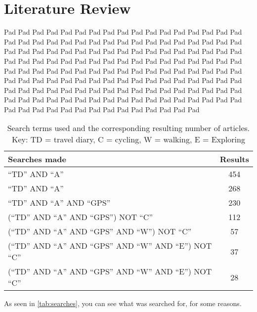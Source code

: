 \chapter{Literature Review}
\label{lr}

Pad Pad Pad Pad Pad Pad Pad Pad Pad Pad Pad Pad Pad Pad Pad Pad Pad Pad Pad Pad Pad Pad Pad Pad Pad Pad Pad Pad Pad Pad Pad Pad Pad Pad Pad Pad Pad Pad Pad Pad Pad Pad Pad Pad Pad Pad Pad Pad Pad Pad Pad Pad Pad Pad Pad Pad Pad Pad Pad Pad Pad Pad Pad Pad Pad Pad Pad Pad Pad Pad Pad Pad Pad Pad Pad Pad Pad Pad Pad Pad Pad Pad Pad Pad Pad Pad Pad Pad Pad Pad Pad Pad Pad Pad Pad Pad Pad Pad Pad Pad Pad Pad Pad Pad Pad Pad Pad Pad Pad Pad Pad Pad Pad Pad Pad Pad Pad Pad Pad Pad Pad Pad Pad Pad Pad Pad Pad Pad Pad Pad Pad Pad Pad Pad Pad Pad Pad Pad Pad Pad Pad Pad Pad Pad Pad Pad Pad Pad Pad Pad 

\begin{table}
\caption{Search terms used and the corresponding resulting number of articles. Key: TD = travel diary, C = cycling, W = walking, E = Exploring}
    \centering
    \footnotesize
        \begin{tabular}{lc}
            \toprule
            Searches made & Results \\
            \midrule
            ``TD'' AND ``A'' & 454 \\

            ``TD'' AND ``A'' & 268 \\

            ``TD'' AND ``A'' AND ``GPS'' & 230 \\

            (``TD'' AND ``A'' AND ``GPS'') NOT ``C'' & 112 \\

            (``TD'' AND ``A'' AND ``GPS'' AND ``W'') NOT ``C'' & 57 \\

            (``TD'' AND ``A'' AND ``GPS'' AND ``W'' AND ``E'') NOT ``C'' & 37 \\

            (``TD'' AND ``A'' AND ``GPS'' AND ``W'' AND ``E'') NOT ``C'' & 28 \\
            \bottomrule
        \end{tabular}
    
    \label{tab:searches}
\end{table}

As seen in \autoref{tab:searches}, you can see what was searched for, for some reasons.